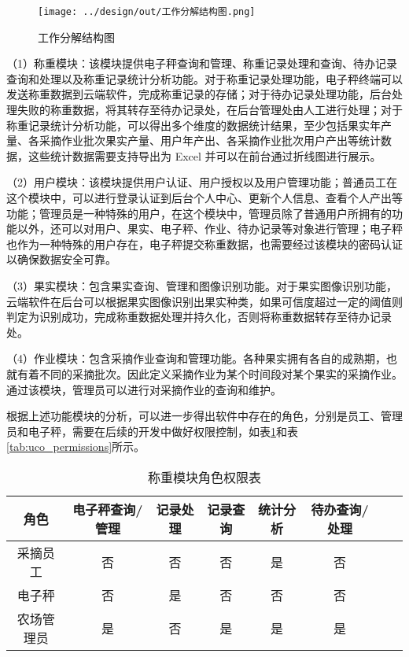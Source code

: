 \begin{figure}[H]
    \centering
    \texttt{[image: ../design/out/工作分解结构图.png]}
    \caption{工作分解结构图}
    \label{fig:工作分解结构图}
\end{figure}

（1）称重模块：该模块提供电子秤查询和管理、称重记录处理和查询、待办记录查询和处理以及称重记录统计分析功能。对于称重记录处理功能，电子秤终端可以发送称重数据到云端软件，完成称重记录的存储；对于待办记录处理功能，后台处理失败的称重数据，将其转存至待办记录处，在后台管理处由人工进行处理；对于称重记录统计分析功能，可以得出多个维度的数据统计结果，至少包括果实年产量、各采摘作业批次果实产量、用户年产出、各采摘作业批次用户产出等统计数据，这些统计数据需要支持导出为 Excel 并可以在前台通过折线图进行展示。

（2）用户模块：该模块提供用户认证、用户授权以及用户管理功能；普通员工在这个模块中，可以进行登录认证到后台个人中心、更新个人信息、查看个人产出等功能；管理员是一种特殊的用户，在这个模块中，管理员除了普通用户所拥有的功能以外，还可以对用户、果实、电子秤、作业、待办记录等对象进行管理；电子秤也作为一种特殊的用户存在，电子秤提交称重数据，也需要经过该模块的密码认证以确保数据安全可靠。

（3）果实模块：包含果实查询、管理和图像识别功能。对于果实图像识别功能，云端软件在后台可以根据果实图像识别出果实种类，如果可信度超过一定的阈值则判定为识别成功，完成称重数据处理并持久化，否则将称重数据转存至待办记录处。

（4）作业模块：包含采摘作业查询和管理功能。各种果实拥有各自的成熟期，也就有着不同的采摘批次。因此定义采摘作业为某个时间段对某个果实的采摘作业。通过该模块，管理员可以进行对采摘作业的查询和维护。

根据上述功能模块的分析，可以进一步得出软件中存在的角色，分别是员工、管理员和电子秤，需要在后续的开发中做好权限控制，如表\ref{tab:uc1_permissions}和表\ref{tab:uco_permissions}所示。

\begin{table}[ht]
\centering
\begin{tabular}{|c|c|c|c|c|c|c|c|}
\hline
角色 & 电子秤查询/管理 & 记录处理 & 记录查询 & 统计分析 & 待办查询/处理 \\
\hline
采摘员工 & 否 & 否 & 否 & 是 & 否 \\
\hline
电子秤 & 否 & 是 & 否 & 否 & 否 \\
\hline
农场管理员 & 是 & 否 & 是 & 是 & 是 \\
\hline
\end{tabular}
\vspace{10pt}
\caption{称重模块角色权限表}
\label{tab:uc1_permissions}
\end{table}


